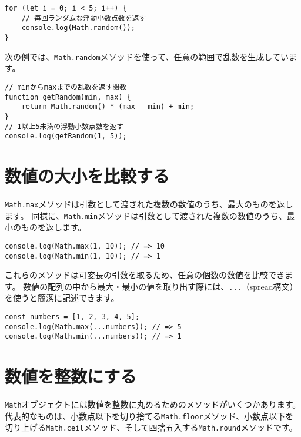 \begin{lstlisting}
for (let i = 0; i < 5; i++) {
    // 毎回ランダムな浮動小数点数を返す
    console.log(Math.random());
}
\end{lstlisting}

次の例では、\texttt{Math.random}メソッドを使って、任意の範囲で乱数を生成しています。

\begin{lstlisting}
// minからmaxまでの乱数を返す関数
function getRandom(min, max) {
    return Math.random() * (max - min) + min;
}
// 1以上5未満の浮動小数点数を返す
console.log(getRandom(1, 5));
\end{lstlisting}

\hypertarget{compare-number}{%
\section{数値の大小を比較する}\label{compare-number}}

\href{https://developer.mozilla.org/ja/docs/Web/JavaScript/Reference/Global_Objects/Math/max}{\texttt{Math.max}}メソッドは引数として渡された複数の数値のうち、最大のものを返します。
同様に、\href{https://developer.mozilla.org/ja/docs/Web/JavaScript/Reference/Global_Objects/Math/min}{\texttt{Math.min}}メソッドは引数として渡された複数の数値のうち、最小のものを返します。

\begin{lstlisting}
console.log(Math.max(1, 10)); // => 10
console.log(Math.min(1, 10)); // => 1
\end{lstlisting}

これらのメソッドは可変長の引数を取るため、任意の個数の数値を比較できます。
数値の配列の中から最大・最小の値を取り出す際には、\texttt{...}（spread構文）を使うと簡潔に記述できます。

\begin{lstlisting}
const numbers = [1, 2, 3, 4, 5];
console.log(Math.max(...numbers)); // => 5
console.log(Math.min(...numbers)); // => 1
\end{lstlisting}

\hypertarget{convert-to-integer}{%
\section{数値を整数にする}\label{convert-to-integer}}

\texttt{Math}オブジェクトには数値を整数に丸めるためのメソッドがいくつかあります。
代表的なものは、小数点以下を切り捨てる\texttt{Math.floor}メソッド、小数点以下を切り上げる\texttt{Math.ceil}メソッド、そして四捨五入する\texttt{Math.round}メソッドです。

